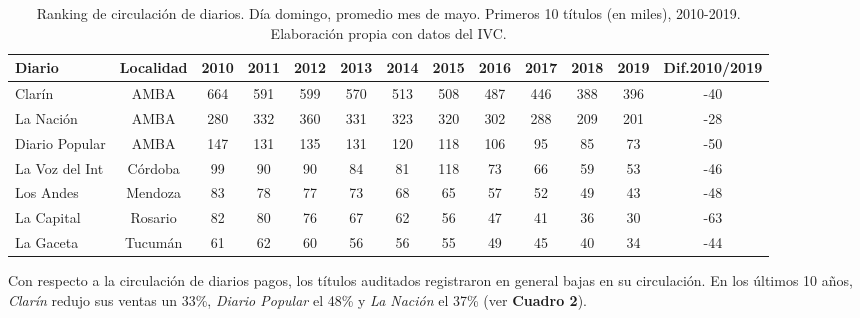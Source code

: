 \begin{table}[!ht]
	\sf\footnotesize\setlength{\tabcolsep}{2pt}
	\centering
	\caption{Ranking de circulación de diarios. Día domingo, promedio mes de mayo. Primeros 10 títulos (en miles), 2010-2019. Elaboración propia con datos del IVC.}
	\begin{tabular}{l | S[table=format=3.0] | S[table=format=3.0] | S[table=format=3.0] | S[table=format=3.0] | S[table=format=3.0] | S[table=format=3.0] | S[table=format=3.0] | S[table=format=3.0] | S[table=format=3.0] | S[table=format=3.0] | S[table=format=3.0] | S[table=format=2.0] }
		\toprule
		\textbf{Diario} & \textbf{Localidad} & \textbf{2010} & \textbf{2011} & \textbf{2012} & \textbf{2013} & \textbf{2014} & \textbf{2015} & \textbf{2016} & \textbf{2017} & \textbf{2018} & \textbf{2019} & \textbf{Dif.2010/2019} \\
		\midrule
		Clarín & AMBA & 664 & 591 & 599 & 570 & 513 & 508 & 487 & 446 & 388 & 396 & -40 \\
		\midrule
		La Nación & AMBA & 280 & 332 & 360 & 331 & 323 & 320 & 302 & 288 & 209 & 201 & -28 \\
		\midrule
		Diario Popular & AMBA & 147 & 131 & 135 & 131 & 120 & 118 & 106 & 95 & 85 & 73 & -50 \\
		\midrule
		La Voz del Int & Córdoba & 99 & 90 & 90 & 84 & 81 & 118 & 73 & 66 & 59 & 53 & -46 \\
		\midrule
		Los Andes & Mendoza & 83 & 78 & 77 & 73 & 68 & 65 & 57 & 52 & 49 & 43 & -48 \\
		\midrule
		La Capital & Rosario & 82 & 80 & 76 & 67 & 62 & 56 & 47 & 41 & 36 & 30 & -63 \\
		\midrule
		La Gaceta & Tucumán & 61 & 62 & 60 & 56 & 56 & 55 & 49 & 45 & 40 & 34 & -44 \\
		\bottomrule
	\end{tabular}
\end{table}


Con respecto a la circulación de diarios pagos, los títulos auditados registraron en general bajas en su circulación. En los últimos 10 años, \emph{Clarín} redujo sus ventas un 33\%, \emph{Diario Popular} el 48\% y \emph{La Nación} el 37\% (ver \textbf{Cuadro 2}).

